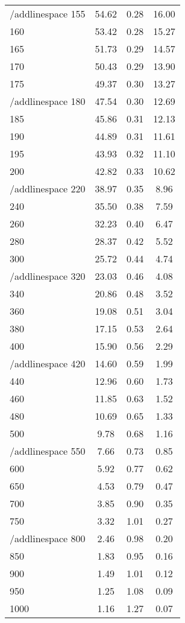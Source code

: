 \begin{table}[ht]
\begin{tabular}{lccc}
   /addlinespace
155 & 54.62 & 0.28 & 16.00 \\ 
  160 & 53.42 & 0.28 & 15.27 \\ 
  165 & 51.73 & 0.29 & 14.57 \\ 
  170 & 50.43 & 0.29 & 13.90 \\ 
  175 & 49.37 & 0.30 & 13.27 \\ 
   /addlinespace
180 & 47.54 & 0.30 & 12.69 \\ 
  185 & 45.86 & 0.31 & 12.13 \\ 
  190 & 44.89 & 0.31 & 11.61 \\ 
  195 & 43.93 & 0.32 & 11.10 \\ 
  200 & 42.82 & 0.33 & 10.62 \\ 
   /addlinespace
220 & 38.97 & 0.35 & 8.96 \\ 
  240 & 35.50 & 0.38 & 7.59 \\ 
  260 & 32.23 & 0.40 & 6.47 \\ 
  280 & 28.37 & 0.42 & 5.52 \\ 
  300 & 25.72 & 0.44 & 4.74 \\ 
   /addlinespace
320 & 23.03 & 0.46 & 4.08 \\ 
  340 & 20.86 & 0.48 & 3.52 \\ 
  360 & 19.08 & 0.51 & 3.04 \\ 
  380 & 17.15 & 0.53 & 2.64 \\ 
  400 & 15.90 & 0.56 & 2.29 \\ 
   /addlinespace
420 & 14.60 & 0.59 & 1.99 \\ 
  440 & 12.96 & 0.60 & 1.73 \\ 
  460 & 11.85 & 0.63 & 1.52 \\ 
  480 & 10.69 & 0.65 & 1.33 \\ 
  500 & 9.78 & 0.68 & 1.16 \\ 
   /addlinespace
550 & 7.66 & 0.73 & 0.85 \\ 
  600 & 5.92 & 0.77 & 0.62 \\ 
  650 & 4.53 & 0.79 & 0.47 \\ 
  700 & 3.85 & 0.90 & 0.35 \\ 
  750 & 3.32 & 1.01 & 0.27 \\ 
   /addlinespace
800 & 2.46 & 0.98 & 0.20 \\ 
  850 & 1.83 & 0.95 & 0.16 \\ 
  900 & 1.49 & 1.01 & 0.12 \\ 
  950 & 1.25 & 1.08 & 0.09 \\ 
  1000 & 1.16 & 1.27 & 0.07 \\ 
   \bottomrule
\end{tabular}
\end{table}
